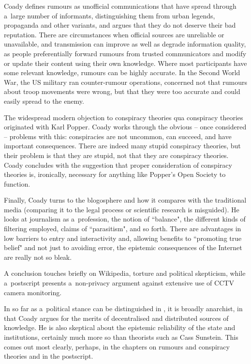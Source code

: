 Coady defines rumours as unofficial communications that have spread through a~large number of informants, distinguishing them from urban legends, propaganda and other variants, and argues that they do not deserve their bad reputation. There are circumstances when official sources are unreliable or unavailable, and transmission can improve as well as degrade information quality, as people preferentially forward rumours from trusted communicators and modify or update their content using their own knowledge. Where most participants have some relevant knowledge, rumours can be highly accurate. In the Second World War, the US military ran counter-rumour operations, concerned not that rumours about troop movements were wrong, but that they were too accurate and could easily spread to the enemy. 

The widespread modern objection to conspiracy theories qua conspiracy theories originated with Karl Popper. Coady works through the obvious -- once considered -- problems with this: conspiracies are not uncommon, can succeed, and have important consequences. There are indeed many stupid conspiracy theories, but their problem is that they are stupid, not that they are conspiracy theories. Coady concludes with the suggestion that proper consideration of conspiracy theories is, ironically, necessary for anything like Popper's Open Society to function. 

Finally, Coady turns to the blogosphere and how it compares with the traditional media (comparing it to the legal process or scientific research is misguided). He looks at journalism as a~profession, the notion of ``balance", the different kinds of filtering employed, claims of ``parasitism", and so forth. There are advantages in low barriers to entry and interactivity and, allowing benefits to ``promoting true belief" and not just to avoiding error, the epistemic consequences of the Internet are really not so bleak. 

A conclusion touches briefly on Wikipedia, torture and political skepticism, while a~postscript presents a~non-privacy argument against extensive use of CCTV camera monitoring. 

In so far as a~political stance can be distinguished in , it is broadly anarchist, in that Coady argues for the merits of decentralised and distributed sources of knowledge. He is also skeptical about the epistemic reliability of the state and institutions, certainly much more so than theorists such as Cass Sunstein. This comes out most clearly, perhaps, in the chapters on rumours and conspiracy theories and in the postscript. 

